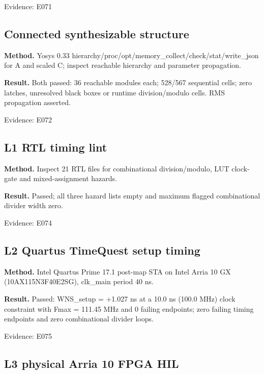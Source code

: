 \documentclass[11pt,a4paper]{article}
\begin{document}
{\small Evidence: E071}

\subsection{Connected synthesizable structure}

\textbf{Method.} Yosys 0.33 hierarchy/\allowbreak{}proc/\allowbreak{}opt/\allowbreak{}memory\_\allowbreak{}collect/\allowbreak{}check/\allowbreak{}stat/\allowbreak{}write\_\allowbreak{}json for A and scaled C; inspect reachable hierarchy and parameter propagation.

\textbf{Result.} Both passed: 36 reachable modules each; 528/\allowbreak{}567 sequential cells; zero latches,\allowbreak{} unresolved black boxes or runtime division/\allowbreak{}modulo cells. RMS propagation asserted.

{\small Evidence: E072}

\subsection{L1 RTL timing lint}

\textbf{Method.} Inspect 21 RTL files for combinational division/\allowbreak{}modulo,\allowbreak{} LUT clock-gate and mixed-assignment hazards.

\textbf{Result.} Passed; all three hazard lists empty and maximum flagged combinational divider width zero.

{\small Evidence: E074}

\subsection{L2 Quartus TimeQuest setup timing}

\textbf{Method.} Intel Quartus Prime 17.1 post-map STA on Intel Arria 10 GX (\allowbreak{}10AX115N3F40E2SG)\allowbreak{},\allowbreak{} clk\_\allowbreak{}main period 40 ns.

\textbf{Result.} Passed: WNS\_\allowbreak{}setup =\allowbreak{} +\allowbreak{}1.027 ns at a 10.0 ns (\allowbreak{}100.0 MHz)\allowbreak{} clock constraint with Fmax =\allowbreak{} 111.45 MHz and 0 failing endpoints; zero failing timing endpoints and zero combinational divider loops.

{\small Evidence: E075}

\subsection{L3 physical Arria 10 FPGA HIL}
\end{document}
